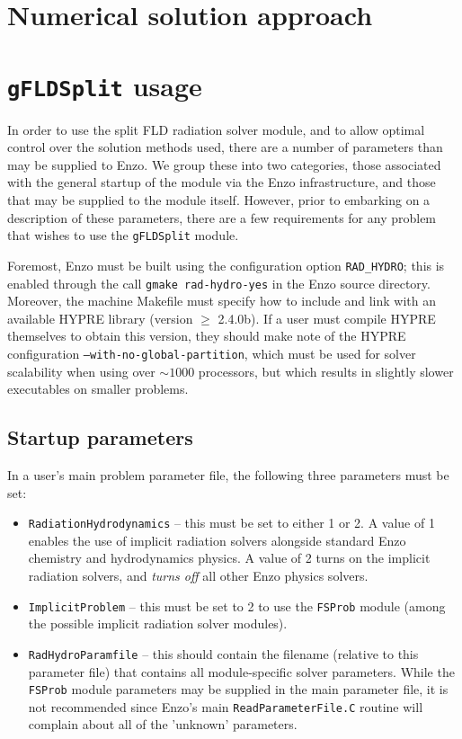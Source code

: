 \documentclass[letterpaper,10pt]{article}
\renewcommand{\(}{\left(}
\renewcommand{\)}{\right)}
\begin{document}
\section{Numerical solution approach}
\label{sec:solution_approach}





\section{{\tt gFLDSplit} usage}
\label{sec:module_usage}

In order to use the split FLD radiation solver module, and to
allow optimal control over the solution methods used, there are a
number of parameters than may be supplied to Enzo.  We group these
into two categories, those associated with the general startup of the
module via the Enzo infrastructure, and those that may be supplied to
the module itself.  However, prior to embarking on a description of
these parameters, there are a few requirements for any problem that
wishes to use the {\tt gFLDSplit} module.

Foremost, Enzo must be built using the configuration option 
{\tt RAD\_HYDRO}; this is enabled through the call 
{\tt gmake rad-hydro-yes} in the Enzo source directory.  Moreover, the
machine Makefile must specify how to include and link with an
available HYPRE library (version $\ge$ 2.4.0b).  If a user must
compile HYPRE themselves to obtain this version, they should make note
of the HYPRE configuration {\tt --with-no-global-partition}, which
must be used for solver scalability when using over $\sim1000$
processors, but which results in slightly slower executables on
smaller problems.


\subsection{Startup parameters}

In a user's main problem parameter file, the following three parameters
must be set:
\begin{itemize}
\item {\tt RadiationHydrodynamics} -- this must be set to either 1 or
  2.  A value of 1 enables the use of implicit radiation solvers
  alongside standard Enzo chemistry and hydrodynamics physics.  A
  value of 2 turns on the implicit radiation solvers, and {\em turns off}  
  all other Enzo physics solvers.
\item {\tt ImplicitProblem} -- this must be set to 2 to use the 
  {\tt FSProb} module (among the possible implicit radiation solver
  modules).
\item {\tt RadHydroParamfile} -- this should contain the filename
  (relative to this parameter file) that contains all module-specific
  solver parameters.  While the {\tt FSProb} module parameters may be
  supplied in the main parameter file, it is not recommended since
  Enzo's main {\tt ReadParameterFile.C} routine will complain about
  all of the 'unknown' parameters.
\end{itemize}
\end{document}
